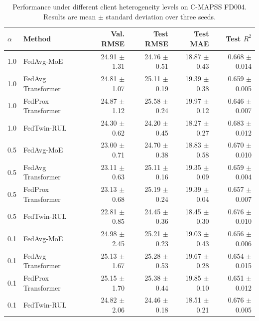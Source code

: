 \begin{table}[t]
\centering
\caption{Performance under different client heterogeneity levels on C-MAPSS FD004. Results are mean $\pm$ standard deviation over three seeds.}
\label{tab:fedtwin_heterogeneity}
\begin{tabular}{llrrrr}
\hline
$\alpha$ & Method & Val. RMSE & Test RMSE & Test MAE & Test $R^2$ \\
\hline
1.0 & FedAvg-MoE & 24.91 $\pm$ 1.31 & 24.76 $\pm$ 0.51 & 18.87 $\pm$ 0.43 & 0.668 $\pm$ 0.014 \\
1.0 & FedAvg Transformer & 24.81 $\pm$ 1.07 & 25.11 $\pm$ 0.19 & 19.39 $\pm$ 0.38 & 0.659 $\pm$ 0.005 \\
1.0 & FedProx Transformer & 24.87 $\pm$ 1.12 & 25.58 $\pm$ 0.24 & 19.97 $\pm$ 0.12 & 0.646 $\pm$ 0.007 \\
1.0 & FedTwin-RUL & 24.30 $\pm$ 0.62 & 24.20 $\pm$ 0.45 & 18.27 $\pm$ 0.27 & 0.683 $\pm$ 0.012 \\
\hline
0.5 & FedAvg-MoE & 23.00 $\pm$ 0.71 & 24.70 $\pm$ 0.38 & 18.83 $\pm$ 0.58 & 0.670 $\pm$ 0.010 \\
0.5 & FedAvg Transformer & 23.11 $\pm$ 0.63 & 25.11 $\pm$ 0.16 & 19.35 $\pm$ 0.09 & 0.659 $\pm$ 0.004 \\
0.5 & FedProx Transformer & 23.13 $\pm$ 0.68 & 25.19 $\pm$ 0.24 & 19.39 $\pm$ 0.04 & 0.657 $\pm$ 0.007 \\
0.5 & FedTwin-RUL & 22.81 $\pm$ 0.85 & 24.45 $\pm$ 0.36 & 18.45 $\pm$ 0.30 & 0.676 $\pm$ 0.010 \\
\hline
0.1 & FedAvg-MoE & 24.98 $\pm$ 2.45 & 25.21 $\pm$ 0.23 & 19.03 $\pm$ 0.43 & 0.656 $\pm$ 0.006 \\
0.1 & FedAvg Transformer & 25.13 $\pm$ 1.67 & 25.28 $\pm$ 0.53 & 19.67 $\pm$ 0.28 & 0.654 $\pm$ 0.015 \\
0.1 & FedProx Transformer & 25.15 $\pm$ 1.70 & 25.38 $\pm$ 0.44 & 19.85 $\pm$ 0.10 & 0.651 $\pm$ 0.012 \\
0.1 & FedTwin-RUL & 24.82 $\pm$ 2.06 & 24.46 $\pm$ 0.18 & 18.51 $\pm$ 0.21 & 0.676 $\pm$ 0.005 \\
\hline
\end{tabular}
\end{table}